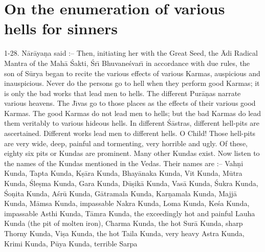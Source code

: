 \chapter{On the enumeration of various hells for sinners}

1-28. N\=ar\=aya\d{n}a said :-- Then, initiating her with the Great Seed, the \=Adi Radical Mantra of the Mah\=a \'Sakti, \'Sr\={\i} Bhuvane\'svar\={\i} in accordance with due rules, the son of S\=urya began to recite the various effects of various Karmas, auspicious and inauspicious. Never do the persons go to hell when they perform good Karmas; it is only the bad works that lead men to hells. The different Pur\=a\d{n}as narrate various heavens. The J\={\i}vas go to those places as the effects of their various good Karmas. The good Karmas do not lead men to hells; but the bad Karmas do lead them veritably to various hideous hells. In different \'S\=astras, different hell-pits are ascertained. Different works lead men to different hells. O Child! Those hell-pits are very wide, deep, painful and tormenting, very horrible and ugly. Of these, eighty six pits or Kundas are prominent. Many other Kundas exist. Now listen to the names of the Kundas mentioned in the Vedas. Their names are :-- Vah\d{n}i Kunda, Tapta Kunda, K\d{s}\=ara Kunda, Bhay\=anaka Kunda, Vit Kunda, M\=utra Kunda, \'Sle\d{s}ma Kunda, Gara Kunda, D\=u\d{s}ik\=a Kunda, Vas\=a Kunda, \'Sukra Kunda, \'So\d{n}ita Kunda, A\'sr\=u Kunda, G\=atramala Kunda, Kar\d{n}amala Kunda, Majj\=a Kunda, M\=amsa Kunda, impassable Nakra Kunda, Loma Kunda, Ke\'sa Kunda, impassable Asthi Kunda, T\=amra Kunda, the exceedingly hot and painful Lauha Kunda (the pit of molten iron), Charma Kunda, the hot Sur\=a Kunda, sharp Thorny Kunda, Vi\d{s}a Kunda, the hot Taila Kunda, very heavy Astra Kunda, Krimi Kunda, P\=uya Kunda, terrible Sarpa

